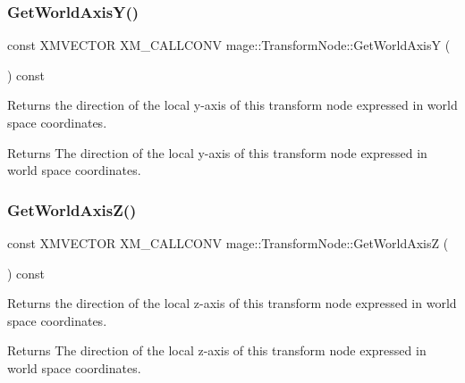 \subsubsection{\texorpdfstring{Get\+World\+Axis\+Y()}{GetWorldAxisY()}}
{\footnotesize\ttfamily const X\+M\+V\+E\+C\+T\+OR X\+M\+\_\+\+C\+A\+L\+L\+C\+O\+NV mage\+::\+Transform\+Node\+::\+Get\+World\+AxisY (\begin{DoxyParamCaption}{ }\end{DoxyParamCaption}) const\hspace{0.3cm}{\ttfamily [noexcept]}}

Returns the direction of the local y-\/axis of this transform node expressed in world space coordinates.

\begin{DoxyReturn}{Returns}
The direction of the local y-\/axis of this transform node expressed in world space coordinates. 
\end{DoxyReturn}
\hypertarget{classmage_1_1_transform_node_ad34e88ffa2b2d3fd781c9645fd2af20c}{}\label{classmage_1_1_transform_node_ad34e88ffa2b2d3fd781c9645fd2af20c} 
\subsubsection{\texorpdfstring{Get\+World\+Axis\+Z()}{GetWorldAxisZ()}}
{\footnotesize\ttfamily const X\+M\+V\+E\+C\+T\+OR X\+M\+\_\+\+C\+A\+L\+L\+C\+O\+NV mage\+::\+Transform\+Node\+::\+Get\+World\+AxisZ (\begin{DoxyParamCaption}{ }\end{DoxyParamCaption}) const\hspace{0.3cm}{\ttfamily [noexcept]}}

Returns the direction of the local z-\/axis of this transform node expressed in world space coordinates.

\begin{DoxyReturn}{Returns}
The direction of the local z-\/axis of this transform node expressed in world space coordinates. 
\end{DoxyReturn}
\hypertarget{classmage_1_1_transform_node_a511e55c63c15d9e8958f33b298b6c103}{}\label{classmage_1_1_transform_node_a511e55c63c15d9e8958f33b298b6c103} 

